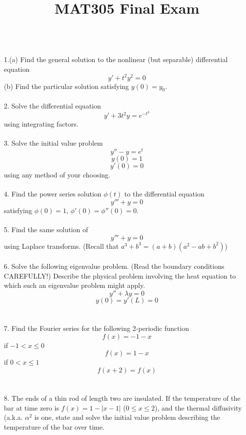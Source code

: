 \documentclass[letter]{article}
\title{MAT305 Final Exam}
\date{}
\begin{document}
\maketitle
\vspace{-.5in}
\indent \\
1.(a) Find the general solution to the nonlinear (but separable) differential equation
\[
y' + t^2 y^2 = 0
\]
(b) Find the particular solution satisfying $y(0) = y_0$.\\
\\
2. Solve the differential equation
\[
y' + 3t^2y = e^{-t^3}
\]
using integrating factors.\\
\\
3. Solve the initial value problem
\[y'' - y = e^t\]
\[y(0) = 1\]
\[y'(0) = 0\]
using any method of your choosing.\\
\\
4. Find the power series solution $\phi(t)$ to the differential equation
\[
y''' + y = 0
\]
satisfying $\phi(0) = 1$, $\phi'(0) = \phi''(0) = 0$.\\
\\
5. Find the same solution of
\[
y''' + y = 0
\]
using Laplace transforms. (Recall that $a^3+b^3 = (a+b)(a^2 - ab + b^2)$)\\
\\
6. Solve the following eigenvalue problem. (Read the boundary conditions CAREFULLY!) Describe the physical problem involving the heat equation to which such an eigenvalue problem might apply.
\[
y'' + \lambda y = 0
\]
\[
y(0) = y'(L) = 0
\]\\
\\
7. Find the Fourier series for the following 2-periodic function
\[
f(x) = -1-x
\]
if $-1<x\leq 0$
\[
f(x) = 1-x
\]
if $0<x\leq 1$
\[
f(x+2) = f(x)
\]\\
\\
8. The ends of a thin rod of length two are insulated. If the temperature of the bar at time zero is $f(x) = 1-|x-1|$ ($0\leq x \leq 2$), and the thermal diffusivity (a.k.a. $\alpha^2$ is one, state and solve the initial value problem describing the temperature of the bar over time.
\end{document}
